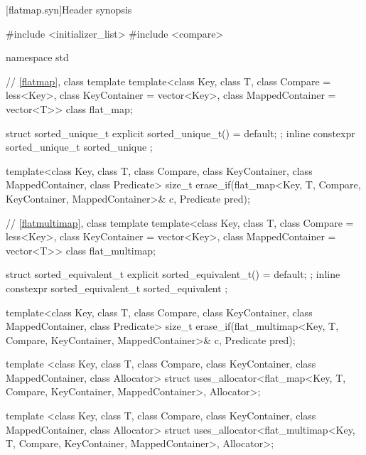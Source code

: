 \noindent\makebox[\linewidth]{\rule{\textwidth}{0.4pt}}

\setcounter{subsection}{3}
\begin{addedblock}
[flatmap.syn]{Header  synopsis}%
%

\begin{codeblock}
#include <initializer_list>
#include <compare>

namespace std {
  // \ref{flatmap}, class template 
  template<class Key, class T, class Compare = less<Key>,
           class KeyContainer = vector<Key>, class MappedContainer = vector<T>>
    class flat_map;

  struct sorted_unique_t { explicit sorted_unique_t() = default; };
  inline constexpr sorted_unique_t sorted_unique {};

  template<class Key, class T, class Compare, class KeyContainer, class MappedContainer,
           class Predicate>
    size_t erase_if(flat_map<Key, T, Compare, KeyContainer, MappedContainer>& c,
                    Predicate pred);

  // \ref{flatmultimap}, class template 
  template<class Key, class T, class Compare = less<Key>,
           class KeyContainer = vector<Key>, class MappedContainer = vector<T>>
    class flat_multimap;

  struct sorted_equivalent_t { explicit sorted_equivalent_t() = default; };
  inline constexpr sorted_equivalent_t sorted_equivalent {};

  template<class Key, class T, class Compare, class KeyContainer, class MappedContainer,
           class Predicate>
    size_t erase_if(flat_multimap<Key, T, Compare, KeyContainer, MappedContainer>& c,
                    Predicate pred);

  template <class Key, class T, class Compare, class KeyContainer, class MappedContainer,
            class Allocator>
    struct uses_allocator<flat_map<Key, T, Compare, KeyContainer, MappedContainer>,
                          Allocator>;

  template <class Key, class T, class Compare, class KeyContainer, class MappedContainer,
            class Allocator>
    struct uses_allocator<flat_multimap<Key, T, Compare, KeyContainer, MappedContainer>,
                          Allocator>;

}
\end{codeblock}
\end{addedblock}

